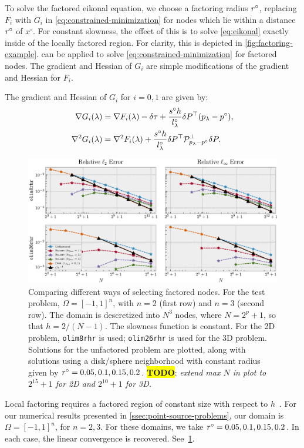 \documentclass[eikonal.tex]{subfiles}
\begin{document}
To solve the factored eikonal equation, we choose a factoring radius
$r^\circ$, replacing $F_i$ with $G_i$ in
\cref{eq:constrained-minimization} for nodes which lie within a
distance $r^\circ$ of $x^\circ$. For constant slowness, the effect of
this is to solve \cref{eq:eikonal} exactly inside of the locally
factored region. For clarity, this is depicted in
\cref{fig:factoring-example}.  can be applied to
solve \cref{eq:constrained-minimization} for factored nodes. The
gradient and Hessian of $G_i$ are simple modifications of the gradient
and Hessian for $F_i$.

\begin{lemma}
  The gradient and Hessian of $G_i$ for $i = 0, 1$ are given
  by:
  \begin{align}
    \label{eq:G-grad-hess}
    \nabla G_i(\lambda) &= \nabla F_i(\lambda) - \delta \tau + \frac{s^\circ h}{l^\circ_\lambda} \delta P^\top {(p_\lambda - p^\circ)}, \\
    \nabla^2 G_i(\lambda) &= \nabla^2 F_i(\lambda) + \frac{s^\circ h}{l^\circ_\lambda} \delta P^\top \calP^\perp_{p_\lambda - p^\circ} \delta P.
  \end{align}
\end{lemma}

\begin{figure}[t]
  \centering
  \includegraphics[width=\linewidth]{factoring-error-example.eps}
  \caption{Comparing different ways of selecting factored nodes. For
    the test problem, $\Omega = [-1, 1]^n$, with $n = 2$ (first row)
    and $n = 3$ (second row). The domain is descretized into $N^3$
    nodes, where $N = 2^p + 1$, so that $h = 2/(N - 1)$. The slowness
    function is constant. For the 2D problem, \texttt{olim8rhr} is
    used; \texttt{olim26rhr} is used for the 3D problem. Solutions for
    the unfactored problem are plotted, along with solutions using a
    disk/sphere neighborhood with constant radius given by
    $r^\circ = 0.05, 0.1, 0.15, 0.2$. \hl{\textbf{TODO}}: \emph{extend
      max $N$ in plot to $2^{15} + 1$ for 2D and $2^{10} + 1$ for
      3D.}}\label{fig:factoring-error-example}
\end{figure}

Local factoring requires a factored region of constant size with
respect to $h$~\cite{qi2018corner}. For our numerical results
presented in \cref{ssec:point-source-problems}, our domain is
$\Omega = [-1, 1]^n$, for $n = 2, 3$. For these domains, we take
$r^\circ = 0.05, 0.1, 0.15, 0.2$. In each case, the linear convergence
is recovered. See~\cref{fig:factoring-error-example}.
\end{document}
